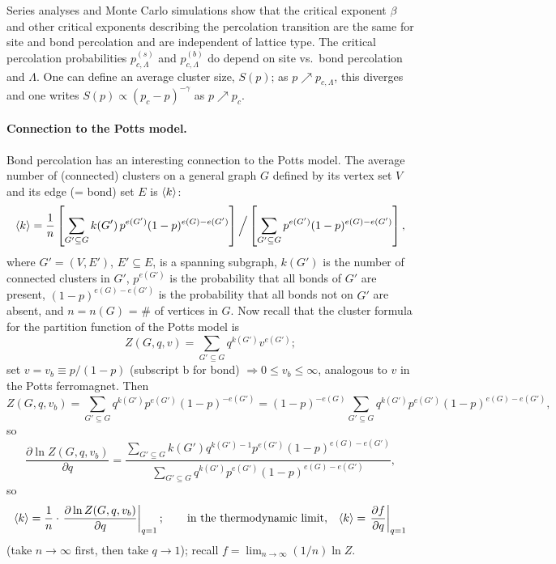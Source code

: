Series analyses and Monte Carlo simulations show that the critical exponent $\beta$ and other critical exponents
describing the percolation transition are the same for site and bond percolation and are independent of lattice type.
The critical percolation probabilities $p_{c,\Lambda}^{(s)}$ and $p_{c,\Lambda}^{(b)}$ do depend on site vs.\ bond
percolation and $\Lambda$. One can define an average cluster size, $S(p)$; as $p\nearrow p_{c,\Lambda}$, this diverges
and one writes $S(p)\propto(p_c-p)^{-\gamma}$ as $p\nearrow p_c$.

\paragraph{Connection to the Potts model.}

Bond percolation has an interesting connection to the Potts model. The average number of (connected) clusters on a
general graph $G$ defined by its vertex set $V$ and its edge (= bond) set $E$ is $\langle k\rangle$:
\begin{equation}
  \langle k\rangle = \frac{1}{n}\left[\sum_{G'\subseteq G}k(G')\,p^{e(G')}(1-p)^{e(G)-e(G')}\right]\Big/\left[\sum_{G'\subseteq G}p^{e(G')}(1-p)^{e(G)-e(G')}\right],
\end{equation}
where $G' = (V,E')$, $E'\subseteq E$, is a spanning subgraph, $k(G')$ is the number of connected clusters in $G'$,
$p^{e(G')}$ is the probability that all bonds of $G'$ are present, $(1-p)^{e(G)-e(G')}$ is the probability that all bonds
not on $G'$ are absent, and $n = n(G)$ = \# of vertices in $G$. Now recall that the cluster formula for the partition
function of the Potts model is
\begin{equation}
  Z(G,q,v) = \sum_{G'\subseteq G}q^{k(G')}v^{e(G')};
\end{equation}
set $v = v_b\equiv p/(1-p)$ (subscript b for bond) $\Rightarrow 0\le v_b\le\infty$, analogous to $v$ in the Potts
ferromagnet. Then
\begin{equation}
  Z(G,q,v_b) = \sum_{G'\subseteq G}q^{k(G')}p^{e(G')}(1-p)^{-e(G')}
  = (1-p)^{-e(G)}\sum_{G'\subseteq G}q^{k(G')}p^{e(G')}(1-p)^{e(G)-e(G')},
\end{equation}
so
\begin{equation}
  \frac{\partial\ln Z(G,q,v_b)}{\partial q}
  = \frac{\sum_{G'\subseteq G}k(G')q^{k(G')-1}p^{e(G')}(1-p)^{e(G)-e(G')}}{\sum_{G'\subseteq G}q^{k(G')}p^{e(G')}(1-p)^{e(G)-e(G')}},
\end{equation}
so
\begin{equation}
  \langle k\rangle = \frac{1}{n}\cdot\left.\frac{\partial\ln Z(G,q,v_b)}{\partial q}\right|_{q=1};\qquad
  \text{in the thermodynamic limit,}\quad \langle k\rangle = \left.\frac{\partial f}{\partial q}\right|_{q=1}
\end{equation}
(take $n\to\infty$ first, then take $q\to 1$); recall $f = \lim_{n\to\infty}(1/n)\ln Z$.

